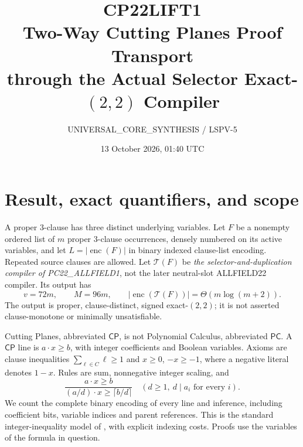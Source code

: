 \documentclass[11pt]{article}
\title{CP22LIFT1\\\large Two-Way Cutting Planes Proof Transport\\through the Actual Selector Exact-$(2,2)$ Compiler}
\author{UNIVERSAL\_CORE\_SYNTHESIS / LSPV-5}
\date{13 October 2026, 01:40 UTC}
\newcommand{\CP}{\mathsf{CP}}
\newcommand{\PC}{\mathsf{PC}}
\newcommand{\TT}{\mathcal T}
\begin{document}
\maketitle
\begin{center}
\end{center}

\section{Result, exact quantifiers, and scope}
A proper 3-clause has three distinct underlying variables. Let $F$ be a
nonempty ordered list of $m$ proper 3-clause occurrences, densely numbered
on its active variables, and let $L=|\operatorname{enc}(F)|$ in binary indexed
clause-list encoding. Repeated source clauses are allowed. Let $\TT(F)$ be
\emph{the selector-and-duplication compiler of PC22\_ALLFIELD1}, not the later
neutral-slot ALLFIELD22 compiler. Its output has
\[
                 v=72m,\qquad M=96m,\qquad
                 |\operatorname{enc}(\TT(F))|=\Theta(m\log(m+2)).       \tag{1}
\]
The output is proper, clause-distinct, signed exact-$(2,2)$; it is not
asserted clause-monotone or minimally unsatisfiable.

Cutting Planes, abbreviated $\CP$, is not Polynomial Calculus, abbreviated
$\PC$. A $\CP$ line is $a\cdot x\ge b$, with integer coefficients and
Boolean variables. Axioms are clause inequalities $\sum_{\ell\in C}\ell\ge1$
and $x\ge0$, $-x\ge-1$, where a negative literal denotes $1-x$.
Rules are sum, nonnegative integer scaling, and
\[
 \frac{a\cdot x\ge b}{(a/d)\cdot x\ge\lceil b/d\rceil}
 \quad(d\ge1,\ d\mid a_i\text{ for every }i).                         \tag{2}
\]
We count the complete binary encoding of every line and inference, including
coefficient bits, variable indices and parent references. This is the standard
integer-inequality model of \cite[Section 2.1]{ln}, with explicit indexing
costs. Proofs use the variables of the formula in question.
\end{document}
